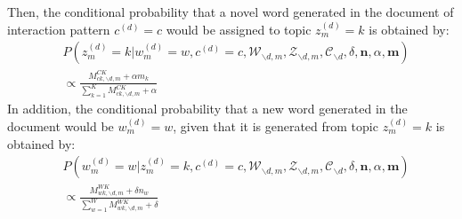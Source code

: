 \documentclass[a4paper]{article}
\begin{document}
Then, the conditional probability that a novel word generated in the document of interaction pattern $c^{(d)}=c$  would be assigned to topic $z_m^{(d)}=k$ is obtained by:
 \begin{equation}
 \begin{aligned}
 &P(z^{(d)}_m=k|w^{(d)}_m=w, c^{(d)}=c, \mathcal{W}_{\backslash d, m}, \mathcal{Z}_{\backslash d,m}, \mathcal{C}_{\backslash d}, \delta, \boldsymbol{n}, \alpha, \boldsymbol{m}) \\& \propto
 \frac{M^{CK}_{ck, \backslash d, m}+\alpha m_k}{\sum_{k=1}^KM^{CK}_{ck, \backslash d, m}+\alpha}
 \end{aligned}
 \end{equation}
In addition, the conditional probability that a new word generated in the document would be $w_m^{(d)}=w$, given that it is generated from topic $z_m^{(d)}=k$ is obtained by:
\begin{equation}
\begin{aligned}
& P(w^{(d)}_m=w|z^{(d)}_m=k, c^{(d)}=c, \mathcal{W}_{\backslash d, m}, \mathcal{Z}_{\backslash d,m}, \mathcal{C}_{\backslash d}, \delta, \boldsymbol{n}, \alpha, \boldsymbol{m}) \\& \propto 
\frac{M_{wk, \backslash d, m}^{WK}+\delta n_w}{\sum_{w=1}^WM_{wk, \backslash d, m}^{WK}+\delta}
\end{aligned} 
 \end{equation}
\end{document}
